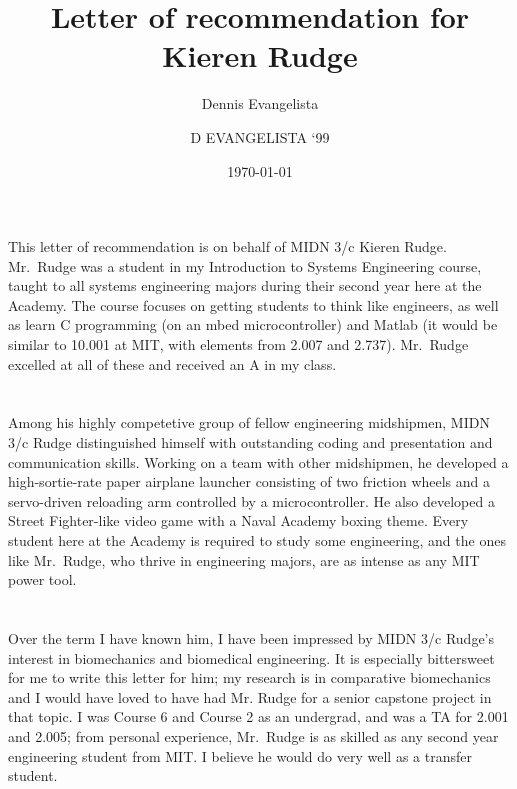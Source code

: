 \documentclass[12pt,courier]{navyletter}
\author{Dennis Evangelista}
\title{Letter of recommendation for Kieren Rudge}
\date{\today}
\begin{document}
\makedateblock{}

\begin{navyletterheader}
\navyskip{}%
\navysubjline%
\end{navyletterheader}

\section{}
This letter of recommendation is on behalf of MIDN 3/c Kieren Rudge.  Mr.~Rudge was a student in my Introduction to Systems Engineering course, taught to all systems engineering majors during their second year here at the Academy. The course focuses on getting students to think like engineers, as well as learn C programming (on an mbed microcontroller) and Matlab (it would be similar to 10.001 at MIT, with elements from 2.007 and 2.737).   Mr.~Rudge excelled at all of these and received an A in my class.  

\section{} 
Among his highly competetive group of fellow engineering midshipmen, MIDN 3/c Rudge distinguished himself with outstanding coding and presentation and communication skills.  Working on a team with other midshipmen, he developed a high-sortie-rate paper airplane launcher consisting of two friction wheels and a servo-driven reloading arm controlled by a microcontroller.   He also developed a Street Fighter-like video game with a Naval Academy boxing theme.  Every student here at the Academy is required to study some engineering, and the ones like Mr.~Rudge, who thrive in engineering majors, are as intense as any MIT power tool.  

\section{}
Over the term I have known him, I have been impressed by MIDN 3/c Rudge's interest in biomechanics and biomedical engineering.  It is especially bittersweet for me to write this letter for him; my research is in comparative biomechanics and I would have loved to have had Mr. Rudge for a senior capstone project in that topic.  I was Course 6 and Course 2 as an undergrad, and was a TA for 2.001 and 2.005; from personal experience, Mr.~Rudge is as skilled as any second year engineering student from MIT.  I believe he would do very well as a transfer student. 


\noclosing{}\\
\noindent\hspace*{4in}
\signature{D EVANGELISTA `99}

\end{document}
